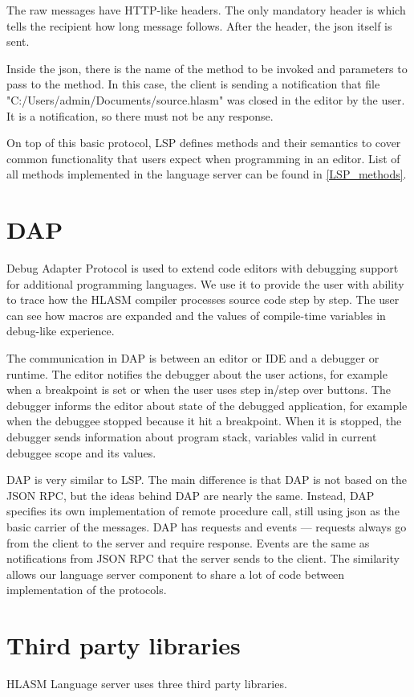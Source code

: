 The raw messages have HTTP-like headers. The only mandatory header is  which tells the recipient how long message follows. After the header, the json itself is sent.

Inside the json, there is the name of the method to be invoked and parameters to pass to the method. In this case, the client is sending a notification that file "C:/Users/admin/Documents/source.hlasm" was closed in the editor by the user. It is a notification, so there must not be any response.

On top of this basic protocol, LSP defines methods and their semantics to cover common functionality that users expect when programming in an editor. List of all methods implemented in the language server can be found in \cref{LSP_methods}.

\section{DAP}
Debug Adapter Protocol is used to extend code editors with debugging support for additional programming languages. We use it to provide the user with ability to trace how the HLASM compiler processes source code step by step. The user can see how macros are expanded and the values of compile-time variables in debug-like experience.

The communication in DAP is between an editor or IDE and a debugger or runtime. The editor notifies the debugger about the user actions, for example when a breakpoint is set or when the user uses step in/step over buttons. The debugger informs the editor about state of the debugged application, for example when the debuggee stopped because it hit a breakpoint. When it is stopped, the debugger sends information about program stack, variables valid in current debuggee scope and its values.

DAP is very similar to LSP. The main difference is that DAP is not based on the JSON RPC, but the ideas behind DAP are nearly the same. Instead, DAP specifies its own implementation of remote procedure call, still using json as the basic carrier of the messages. DAP has requests and events --- requests always go from the client to the server and require response. Events are the same as notifications from JSON RPC that the server sends to the client. The similarity allows our language server component to share a lot of code between implementation of the protocols.

\section{Third party libraries}
HLASM Language server uses three third party libraries.

